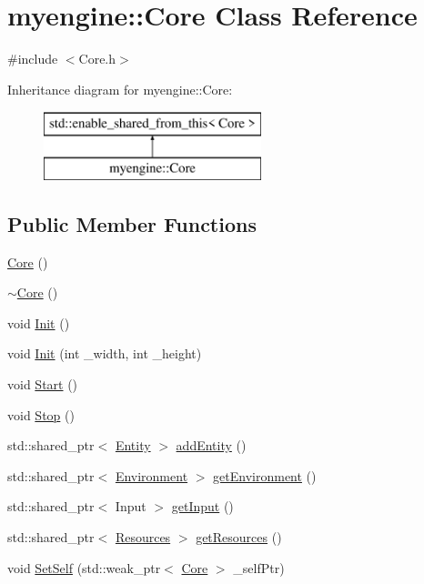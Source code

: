 \hypertarget{classmyengine_1_1_core}{}\section{myengine\+:\+:Core Class Reference}
\label{classmyengine_1_1_core}


{\ttfamily \#include $<$Core.\+h$>$}

Inheritance diagram for myengine\+:\+:Core\+:\begin{figure}[H]
\begin{center}
\leavevmode
\includegraphics[height=2.000000cm]{classmyengine_1_1_core}
\end{center}
\end{figure}
\subsection*{Public Member Functions}
\begin{DoxyCompactItemize}
\item 
\hyperlink{classmyengine_1_1_core_a51a936e2f539b33caaf91b9b38d5e8da}{Core} ()
\item 
\hyperlink{classmyengine_1_1_core_af8293765bd17b1e0003df3820fa38990}{$\sim$\+Core} ()
\item 
void \hyperlink{classmyengine_1_1_core_aa0e8cb43d17f7294adf039064bc555bc}{Init} ()
\item 
void \hyperlink{classmyengine_1_1_core_ac7ce6b74d6b0228a1b5125ec3373e8b0}{Init} (int \+\_\+width, int \+\_\+height)
\item 
void \hyperlink{classmyengine_1_1_core_a15a52e8674f890144428059b80cf1330}{Start} ()
\item 
void \hyperlink{classmyengine_1_1_core_ab93156cb1b35d422d2827ffe1e431b4a}{Stop} ()
\item 
std\+::shared\+\_\+ptr$<$ \hyperlink{classmyengine_1_1_entity}{Entity} $>$ \hyperlink{classmyengine_1_1_core_abf2eea4d6b0d3788761ea11f34c4981d}{add\+Entity} ()
\item 
std\+::shared\+\_\+ptr$<$ \hyperlink{classmyengine_1_1_environment}{Environment} $>$ \hyperlink{classmyengine_1_1_core_a24c44abbba15cf736ed13c72923863e2}{get\+Environment} ()
\item 
std\+::shared\+\_\+ptr$<$ Input $>$ \hyperlink{classmyengine_1_1_core_ae0824780726297ed16b6ea4d4c009f76}{get\+Input} ()
\item 
std\+::shared\+\_\+ptr$<$ \hyperlink{classmyengine_1_1_resources}{Resources} $>$ \hyperlink{classmyengine_1_1_core_a82f9fc96dd0d9cb9fd29c0aa7cf83c45}{get\+Resources} ()
\item 
void \hyperlink{classmyengine_1_1_core_a250805a435bee8689d7f9bd44c8e7f79}{Set\+Self} (std\+::weak\+\_\+ptr$<$ \hyperlink{classmyengine_1_1_core}{Core} $>$ \+\_\+self\+Ptr)
\end{DoxyCompactItemize}


